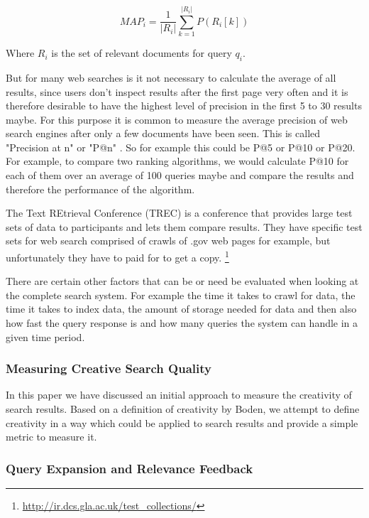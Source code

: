 \begin{equation}
  MAP_i = \frac{1}{|R_i|} \sum_{k=1}^{|R_i|} P(R_i[k])
  \label{eq:MAP}
\end{equation}

Where $R_i$ is the set of relevant documents for query $q_i$.

But for many web searches is it not necessary to calculate the average of all results, since users don't inspect results after the first page very often and it is therefore desirable to have the highest level of precision in the first 5 to 30 results maybe. For this purpose it is common to measure the average precision of web search engines after only a few documents have been seen. This is called "Precision at n" or "P@n" \citep[p.140]{Baeza-Yates2011}. So for example this could be P@5 or P@10 or P@20. For example, to compare two ranking algorithms, we would calculate P@10 for each of them over an average of 100 queries maybe and compare the results and therefore the performance of the algorithm.

The Text REtrieval Conference (TREC) is a conference that provides large test sets of data to participants and lets them compare results. They have specific test sets for web search comprised of crawls of .gov web pages for example, but unfortunately they have to paid for to get a copy. \footnote{\url{http://ir.dcs.gla.ac.uk/test_collections/}}

There are certain other factors that can be or need be evaluated when looking at the complete search system. For example the time it takes to crawl for data, the time it takes to index data, the amount of storage needed for data and then also how fast the query response is and how many queries the system can handle in a given time period.


\subsubsection{Measuring Creative Search Quality}

In this paper \citep{Sawle2011} we have discussed an initial approach to measure the creativity of search results. Based on a definition of creativity by Boden, we attempt to define creativity in a way which could be applied to search results and provide a simple metric to measure it.


\subsubsection{Query Expansion and Relevance Feedback}

